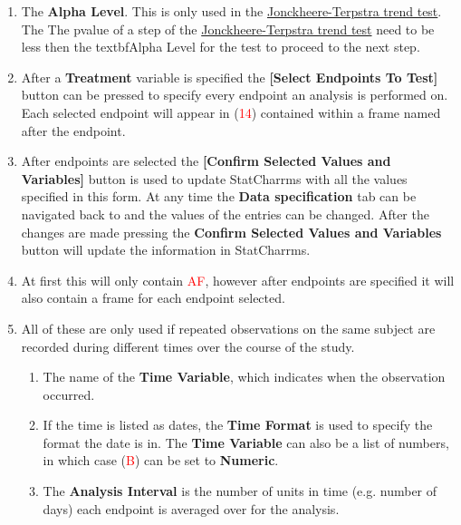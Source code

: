 \documentclass[a4paper]{article}
\begin{document}
\begin{enumerate}
\item[\begingroup\color{red}11:\endgroup] The \textbf{Alpha Level}. This is only used in the \hyperlink{aly:JT}{Jonckheere-Terpstra trend test}.  The  
    The p\textendash{}value of a step of the  \hyperlink{aly:JT}{Jonckheere-Terpstra trend test} need to be less then the textbf{Alpha Level} for the test 
	to proceed to the next step. 
 	
\item[\begingroup\color{red}12:\endgroup] After a \textbf{Treatment} variable is specified the 
	\textbf{[Select Endpoints To Test]} button
	can be pressed to specify every endpoint an analysis is performed on. 
	Each selected endpoint will appear in (\textcolor{red}{14}) contained 
	within a frame named after the endpoint.
	
\item[\begingroup\color{red}13:\endgroup] After endpoints are selected the \textbf{[Confirm Selected Values and Variables]} 
	button is used to update StatCharrms with all the values specified in this form.  At any time the 
	\textbf{Data specification} tab can be navigated back to and the values of the entries can be changed. 
	After the changes are made pressing the \textbf{Confirm Selected Values and Variables} button will update the information in StatCharrms.

\item[\begingroup\color{red} 14:\endgroup] At first this will only contain \textcolor{red}{A\textendash{}F}, however after endpoints are specified it will also
	contain a frame for each endpoint selected.

\item[\begingroup\color{red} A\textendash{}F:\endgroup] All of these are only used if repeated observations on the same subject are 
	recorded during different times over the course of the study. 
	
	\begin{enumerate}
		\item[\begingroup\color{red}A:\endgroup] The name of the \textbf{Time Variable}, which indicates when the observation occurred.
		
		\item[\begingroup\color{red}B:\endgroup] If the time is listed as dates, the \textbf{Time Format} is used to specify the format the date is in. 
			The \textbf{Time Variable} can also be a list of numbers, in which case (\textcolor{red}{B}) can be set to \textbf{Numeric}.
		
		\item[\begingroup\color{red}C:\endgroup] The \textbf{Analysis Interval} is the number of units in time (e.g. number of days) each endpoint is averaged over for the analysis.  


\end{enumerate}
\end{enumerate}
\end{document}
